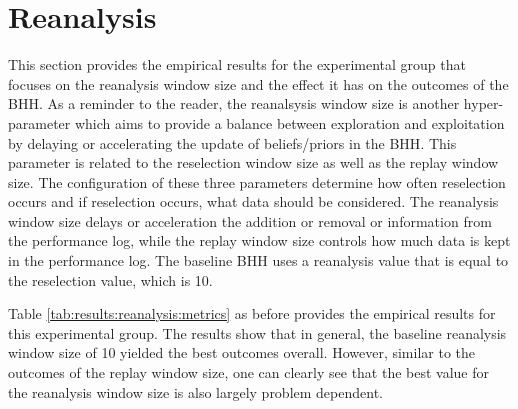 \section{Reanalysis}
\label{sec:results:reanalysis}

This section provides the empirical results for the experimental group that focuses on the reanalysis window size and the effect it has on the outcomes of the \Ac{BHH}. As a reminder to the reader, the reanalsysis window size is another hyper-parameter which aims to provide a balance between exploration and exploitation by delaying or accelerating the update of beliefs/priors in the \Ac{BHH}. This parameter is related to the reselection window size as well as the replay window size. The configuration of these three parameters determine how often reselection occurs and if reselection occurs, what data should be considered. The reanalysis window size delays or acceleration the addition or removal or information from the performance log, while the replay window size controls how much data is kept in the performance log. The baseline \Ac{BHH} uses a reanalysis value that is equal to the reselection value, which is 10.

Table \ref{tab:results:reanalysis:metrics} as before provides the empirical results for this experimental group. The results show that in general, the baseline reanalysis window size of 10 yielded the best outcomes overall. However, similar to the outcomes of the replay window size, one can clearly see that the best value for the reanalysis window size is also largely problem dependent.

